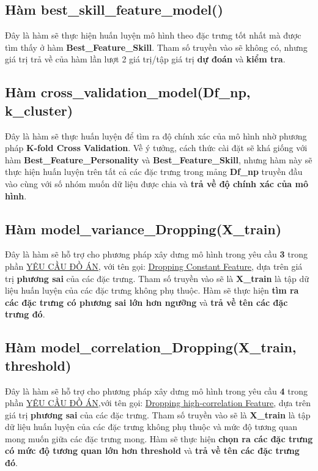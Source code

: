 \documentclass{report}
\begin{document}
\subsection{Hàm best\_skill\_feature\_model()}\label{sec:bestskillfeaturemodel}
    Đây là hàm sẽ thực hiện huấn luyện mô hình theo đặc trưng tốt nhất mà được tìm thấy ở hàm \textbf{Best\_Feature\_Skill}. Tham số truyền vào sẽ không có, nhưng giá trị trả về của hàm lần lượt 2 giá trị/tập giá trị \textbf{dự đoán} và \textbf{kiểm tra}.

\subsection{Hàm cross\_validation\_model(Df\_np, k\_cluster)}
    Đây là hàm sẽ thực huấn luyện để tìm ra độ chính xác của mô hình nhờ phương pháp \textbf{K-fold Cross Validation}. Về ý tưởng, cách thức cài đặt sẽ khá giống với hàm \textbf{Best\_Feature\_Personality} và \textbf{Best\_Feature\_Skill}, nhưng hàm này sẽ thực hiện huấn luyện trên tất cả các đặc trưng trong mảng \textbf{Df\_np} truyền đầu vào cùng với số nhóm muốn dữ liệu được chia và \textbf{trả về độ chính xác của mô hình}.

\subsection{Hàm model\_variance\_Dropping(X\_train)}\label{sec:droping-constant-feature}
    Đây là hàm sẽ hỗ trợ cho phương pháp xây dưng mô hình trong yêu cầu \textbf{3} trong phần \hyperref[sec:requirement]{\underline{YÊU CẦU ĐỒ ÁN}}, với tên gọi: \hyperref[sec:dropping-constant-feature]{\underline{Dropping Constant Feature}}, dựa trên giá trị \textbf{phương sai} của các đặc trưng. Tham số truyền vào sẽ là \textbf{X\_train} là tập dữ liệu huấn luyện của các đặc trưng không phụ thuộc. Hàm sẽ thực hiện \textbf{tìm ra các đặc trưng có phương sai lớn hơn ngưỡng} và \textbf{trả về tên các đặc trưng đó}.

\subsection{Hàm model\_correlation\_Dropping(X\_train, threshold)}
    Đây là hàm sẽ hỗ trợ cho phương pháp xây dưng mô hình trong yêu cầu \textbf{4} trong phần \hyperref[sec:requirement]{\underline{YÊU CẦU ĐỒ ÁN}},với tên gọi: \hyperref[sec:dropping-correlation-feature]{\underline{Dropping high-correlation Feature}}, dựa trên giá trị \textbf{phương sai} của các đặc trưng. Tham số truyền vào sẽ là \textbf{X\_train} là tập dữ liệu huấn luyện của các đặc trưng không phụ thuộc và mức độ tương quan mong muốn giữa các đặc trưng mong. Hàm sẽ thực hiện \textbf{chọn ra các đặc trưng có mức độ tương quan lớn hơn \textbf{threshold}} và \textbf{trả về tên các đặc trưng đó}.
\end{document}
